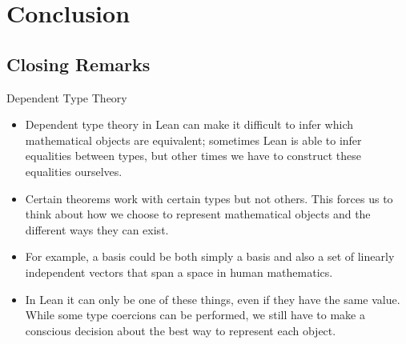 \documentclass[svgnames]{beamer}
\begin{document}
\section{Conclusion}
\subsection{Closing Remarks}

\begin{frame}{Dependent Type Theory}
\begin{itemize}[<+->]
\item Dependent type theory in Lean can make it difficult to infer which mathematical objects are equivalent; sometimes Lean is able to infer equalities between types, but other times we have to construct these equalities ourselves. 
\item Certain theorems work with certain types but not others. This forces us to think about how we choose to represent mathematical objects and the different ways they can exist.
\item For example, a basis could be both simply a basis and also a set of linearly independent vectors that span a space in human mathematics.
\item In Lean it can only be one of these things, even if they have the same value. While some type coercions can be performed, we still have to make a conscious decision about the best way to represent each object.

\end{itemize}
\end{frame}
\end{document}
